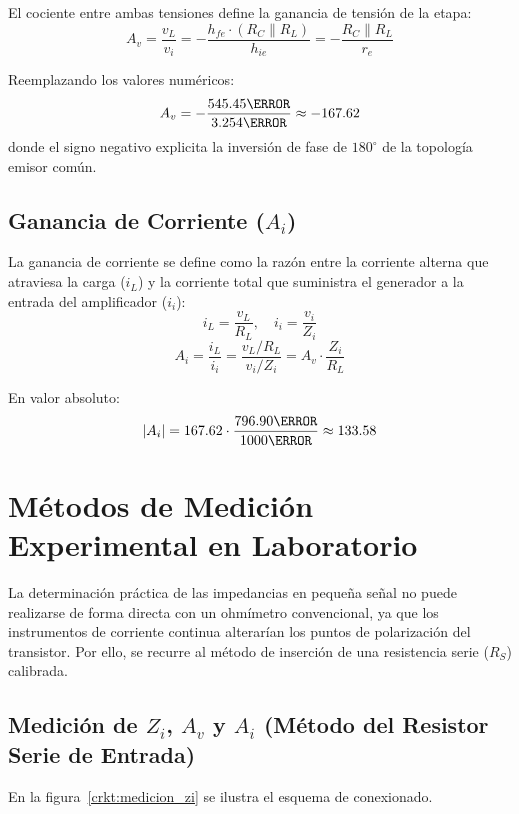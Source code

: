 El cociente entre ambas tensiones define la ganancia de tensión de la etapa:
\begin{equation}
  A_v = \frac{v_L}{v_i} = -\frac{h_{fe} \cdot (R_C \parallel R_L)}{h_{ie}} = -\frac{R_C \parallel R_L}{r_e}
  \label{eq:Av_formula}
\end{equation}

Reemplazando los valores numéricos:
\begin{equation}
  A_v = -\frac{545.45\ohm}{3.254\ohm} \approx -167.62
  \label{eq:Av_teorica}
\end{equation}
donde el signo negativo explicita la inversión de fase de $180^\circ$ de la topología emisor común.

\subsection{Ganancia de Corriente (\texorpdfstring{$A_i$}{Ai})}
La ganancia de corriente se define como la razón entre la corriente alterna que atraviesa la carga ($i_L$) y la
corriente total que suministra el generador a la entrada del amplificador ($i_i$):
\begin{equation}
  i_L = \frac{v_L}{R_L}, \quad i_i = \frac{v_i}{Z_i}
\end{equation}
\begin{equation}
  A_i = \frac{i_L}{i_i} = \frac{v_L / R_L}{v_i / Z_i} = A_v \cdot \frac{Z_i}{R_L}
  \label{eq:Ai_formula}
\end{equation}

En valor absoluto:
\begin{equation}
  |A_i| = 167.62 \cdot \frac{796.90\ohm}{1000\ohm} \approx 133.58
  \label{eq:Ai_teorica}
\end{equation}

\section{Métodos de Medición Experimental en Laboratorio}

La determinación práctica de las impedancias en pequeña señal no puede realizarse de forma directa con un ohmímetro
convencional, ya que los instrumentos de corriente continua alterarían los puntos de polarización del transistor. Por
ello, se recurre al método de inserción de una resistencia serie ($R_S$) calibrada.

\subsection{Medición de \texorpdfstring{$Z_i$, $A_v$ y $A_i$}{Zi, Av y Ai} (Método del Resistor Serie de Entrada)}
En la figura~\ref{crkt:medicion_zi} se ilustra el esquema de conexionado.

